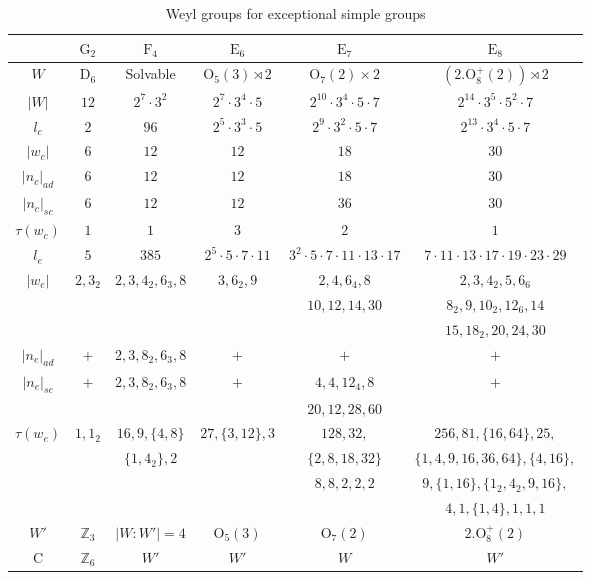 \documentclass[a4paper,12pt]{amsart}
\theoremstyle{plain}
\theoremstyle{definition}
\begin{document}
\begin{table}[H]
	\centering
	\caption{Weyl groups for exceptional simple groups}\label{Table_Exceptional}
	\begin{tabular}{|c|c|c|c|c|c|}
		\hline
		& $\operatorname{G_2}$ & $\operatorname{F_4}$ & $\operatorname{E_6}$ & $\operatorname{E_7}$ & $\operatorname{E_8}$ \\ \hline
		${W}$ & $\operatorname{D_{6}}$ & Solvable & $\operatorname{O_5(3)\rtimes2}$ & $\operatorname{O_7(2)\times2}$  & $(2.\operatorname{O_8^+(2)})\rtimes2$ \\ \hline
		$|{W}|$ & $12$ & $2^7\!\cdot\! 3^2$ & $2^7\!\cdot3^4\!\cdot5$ & $2^{10}\!\cdot3^4\!\cdot5\!\cdot7$  & $2^{14}\!\cdot3^5\!\cdot5^2\!\cdot7$ \\ \hline
		$l_c$ & $2$ & $96$ & $2^5\!\cdot3^3\!\cdot5$ & $2^9\!\cdot3^2\!\cdot5\!\cdot7$  & $2^{13}\!\cdot3^4\!\cdot5\!\cdot7$ \\  \hline
		$|w_c|$ & $6$ & $12$ & $12$ & $18$  & $30$ \\  \hline
		$|n_c|_{ad}$ & $6$ & $12$ & $12$ & $18$ & $30$ \\  \hline
		$|n_c|_{sc}$ & $6$ & $12$ & $12$ & $36$ & $30$ \\  \hline
		$\tau(w_c)$ & $1$ & $1$ & $3$ & $2$  & $1$ \\  \hline
		$l_e$ & $5$ & $385$ & $2^5\!\cdot5\!\cdot7\!\cdot11$ & $3^2\!\cdot5\!\cdot7\!\cdot11\!\cdot13\!\cdot17$  & $7\!\cdot11\!\cdot13\!\cdot17\!\cdot19\!\cdot23\!\cdot29$  \\  \hline
		$|w_e|$ & $2,3_2$ & $2,3,4_2,6_3,8$ & $3,6_2,9$ & $2,4,6_4,8$  & $2,3,4_2,5,6_6$ \\
			&  &  &  & $10,12,14,30$  & $8_2,9,10_2,12_6,14$ \\
			&  &  &  &   & $15,18_2,20,24,30$ \\  \hline
		$|n_e|_{ad}$ & $+$ & $2,3,8_2,6_3,8$ & $+$ & $+$ & $+$ \\  \hline
		$|n_e|_{sc}$ & $+$ & $2,3,8_2,6_3,8$ & $+$ & $4,4,12_4,8$ & $+$ \\
		    &  &  &  & $20,12,28,60$ &  \\  \hline
		$\tau(w_e)$ & $1,1_2$ & $16,9,\{4,8\}$ & $27,\{3,12\},3$ & $128,32,$  & $256,81,\{16,64\},25,$ \\
	    	&  & $\{1,4_2\},2$ &  & $\{2,8,18,32\}$  & $\{1,4,9,16,36,64\},\{4,16\},$ \\
	    	&  &  &  & $8,8,2,2,2$ & $9,\{1,16\},\{1_2,4_2,9,16\},$ \\
			&  &  &  &  & $4,1,\{1,4\},1,1,1$ \\  \hline
		${W}'$ & $\mathbb{Z}_3$ & $|{W}:{W}'|=4$ & $\operatorname{O_5(3)}$ & $\operatorname{O_7(2)}$  & $2.\operatorname{O_8^+(2)}$ \\ \hline
		$\operatorname{C}$ & $\mathbb{Z}_6$ & ${W}'$ & $W'$ & ${W}$  & ${W}'$ \\ \hline
		\end{tabular}
	\end{table}
\end{document}
